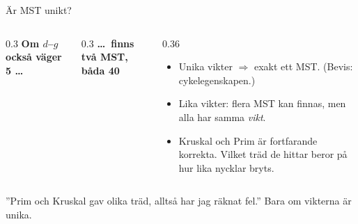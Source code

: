 \begin{frame}{Är MST unikt?}
\begin{columns}[T]
\begin{column}{0.3\textwidth}
\centering
{\scriptsize\bfseries Om $d$--$g$ också väger 5 \dots}\par

\end{column}
\begin{column}{0.3\textwidth}
\centering
{\scriptsize\bfseries \dots\ finns två MST, båda 40}\par

\end{column}
\begin{column}{0.36\textwidth}
\footnotesize
\begin{itemize}\setlength{\itemsep}{3pt}
  \item Unika vikter $\Rightarrow$ exakt ett MST. (Bevis: cykelegenskapen.)
  \item Lika vikter: flera MST kan finnas, men alla har samma \emph{vikt}.
  \item Kruskal och Prim är fortfarande korrekta. Vilket träd de hittar beror på
        hur lika nycklar bryts.
\end{itemize}
\end{column}
\end{columns}
\vfill
\begin{missbox}
”Prim och Kruskal gav olika träd, alltså har jag räknat fel.” Bara om vikterna är unika.
\end{missbox}
\end{frame}

